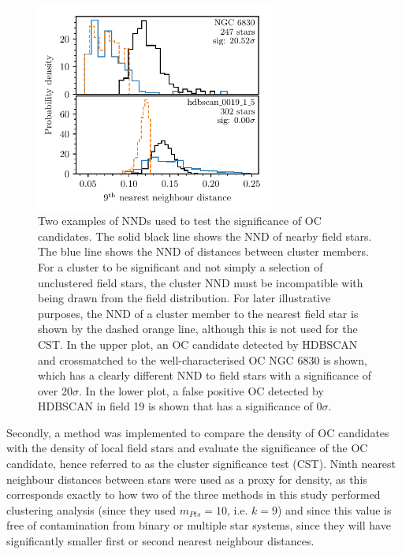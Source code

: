 \begin{figure}[t]
   \centering
   \includegraphics[width=0.7\textwidth]{fig/c2/fig_nn_distances.pdf}
   \caption[Two examples of NNDs used to test the significance of OC candidates]{Two examples of NNDs used to test the significance of OC candidates. The solid black line shows the NND of nearby field stars. The blue line shows the NND of distances between cluster members. For a cluster to be significant and not simply a selection of unclustered field stars, the cluster NND must be incompatible with being drawn from the field distribution. For later illustrative purposes, the NND of a cluster member to the nearest field star is shown by the dashed orange line, although this is not used for the CST. In the upper plot, an OC candidate detected by HDBSCAN and crossmatched to the well-characterised OC NGC 6830 is shown, which has a clearly different NND to field stars with a significance of over 20$\sigma$. In the lower plot, a false positive OC detected by HDBSCAN in field 19 is shown that has a significance of 0$\sigma$.}\label{c2:fig:nn_distances}%
\end{figure}

Secondly, a method was implemented to compare the density of OC candidates with the density of local field stars and evaluate the significance of the OC candidate, hence referred to as the cluster significance test (CST). Ninth nearest neighbour distances between stars were used as a proxy for density, as this corresponds exactly to how two of the three methods in this study performed clustering analysis (since they used $m_{Pts}=10$, i.e. $k=9$) and since this value is free of contamination from binary or multiple star systems, since they will have significantly smaller first or second nearest neighbour distances.

